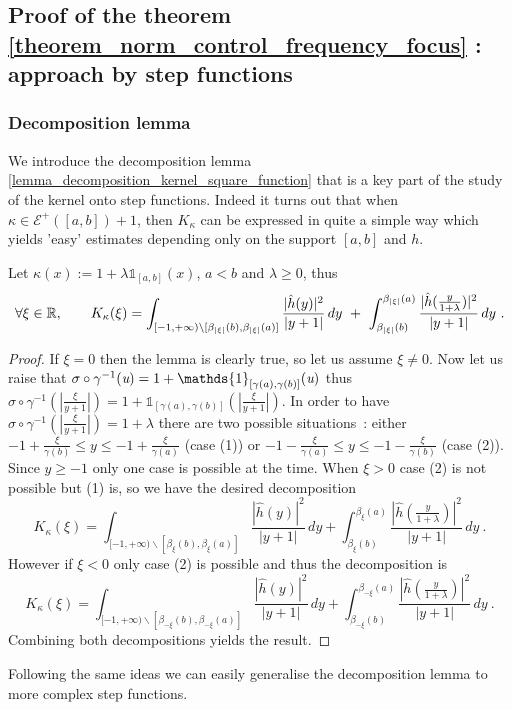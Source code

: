 \subsection{Proof of the theorem \ref{theorem_norm_control_frequency_focus} : approach by step functions }\label{ssection_rectangular_function_frequency_focus}

\subsubsection{Decomposition lemma}

We introduce the decomposition lemma \ref{lemma_decomposition_kernel_square_function} that is a key part of the study of the kernel onto step functions. Indeed it turns out that when $\kappa\in\mathcal{E}^+([a,b])+1$, then $K_\kappa$ can be expressed in quite a simple way which yields 'easy' estimates depending only on the support $[a,b]$ and $h$.

\begin{lemma}
	\label{lemma_decomposition_kernel_square_function}
	Let $\kappa(x):=1+\lambda\mathds{1}_{[a,b]}(x)$, $a<b$ and $\lambda\geqslant0$, thus
	\begin{equation}
		\forall \xi\in\R,\qquad K_\kappa(\xi) = \int_{[-1,+\infty)\backslash [\beta_{|\xi|}(b),\beta_{|\xi|}(a)]}\frac{|\hat{h}(y)|^2}{|y+1|}\,dy\ +\  \int_{\beta_{|\xi|}(b)}^{\beta_{|\xi|}(a)}\frac{|\hat{h}(\tfrac{y}{1+\lambda})|^2}{|y+1|}\,dy\ .
	\end{equation}
	
\end{lemma}
\begin{proof}
	If $\xi=0$ then the lemma is clearly true, so let us assume $\xi\not=0$. Now let us raise that $\sigma\circ\gamma^{-1}(\u)=1+\mathds{1}_{[\gamma(a),\gamma(b)]}(\u)$ thus $\sigma\circ\gamma^{-1}(|\tfrac{\xi}{y+1}|)=1+\mathds{1}_{[\gamma(a),\gamma(b)]}(|\tfrac{\xi}{y+1}|)$. In order to have $\sigma\circ\gamma^{-1}(|\tfrac{\xi}{y+1}|)=1+\lambda$ there are two possible situations~: either $-1+\frac{\xi}{\gamma(b)} \leqslant y \leqslant -1+\frac{\xi}{\gamma(a)}$ (case (1)) or $-1-\frac{\xi}{\gamma(a)} \leqslant y \leqslant -1-\frac{\xi}{\gamma(b)}$ (case (2)). Since $y\geqslant -1$ only one case is possible at the time. When $\xi>0$ case (2) is not possible but (1) is, so we have the desired decomposition
	\begin{equation}
		K_\kappa(\xi) = \int_{[-1,+\infty)\backslash [\beta_\xi(b),\beta_\xi(a)]}\frac{|\hat{h}(y)|^2}{|y+1|}\,dy + \int_{\beta_\xi(b)}^{\beta_\xi(a)}\frac{|\hat{h}(\tfrac{y}{1+\lambda})|^2}{|y+1|}\,dy\ .
	\end{equation}
	However if $\xi<0$ only case (2) is possible and thus the decomposition is
	\begin{equation}
		K_\kappa(\xi) = \int_{[-1,+\infty)\backslash [\beta_{-\xi}(b),\beta_{-\xi}(a)]}\frac{|\hat{h}(y)|^2}{|y+1|}\,dy + \int_{\beta_{-\xi}(b)}^{\beta_{-\xi}(a)}\frac{|\hat{h}(\tfrac{y}{1+\lambda})|^2}{|y+1|}\,dy\ .
	\end{equation}
	Combining both decompositions yields the result.
\end{proof}
Following the same ideas we can easily generalise the decomposition lemma to more complex step functions.

